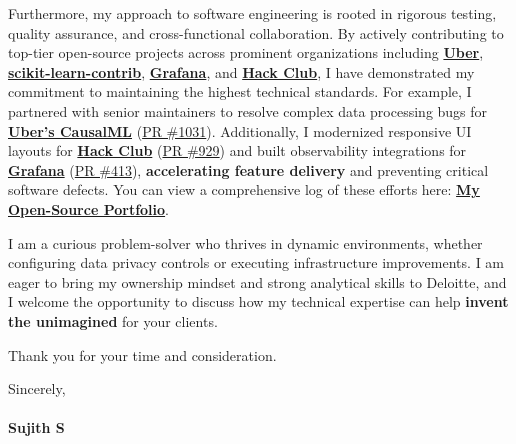 \documentclass[a4paper,11pt]{article}
\newcommand{\ulink}[2]{\href{#1}{#2}}
\begin{document}
Furthermore, my approach to software engineering is rooted in rigorous testing, quality assurance, and cross-functional collaboration. By actively contributing to top-tier open-source projects across prominent organizations including \ulink{https://github.com/uber}{\textbf{Uber}}, \ulink{https://github.com/scikit-learn-contrib}{\textbf{scikit-learn-contrib}}, \ulink{https://github.com/grafana}{\textbf{Grafana}}, and \ulink{https://github.com/hackclub}{\textbf{Hack Club}}, I have demonstrated my commitment to maintaining the highest technical standards. For example, I partnered with senior maintainers to resolve complex data processing bugs for \ulink{https://github.com/uber/causalml}{\textbf{Uber's CausalML}} (\ulink{https://github.com/uber/causalml/pull/1031}{PR \#1031}). Additionally, I modernized responsive UI layouts for \ulink{https://github.com/hackclub/stardance}{\textbf{Hack Club}} (\ulink{https://github.com/hackclub/stardance/pull/929}{PR \#929}) and built observability integrations for \ulink{https://github.com/grafana/alloy-scenarios}{\textbf{Grafana}} (\ulink{https://github.com/grafana/alloy-scenarios/pull/413}{PR \#413}), \textbf{accelerating feature delivery} and preventing critical software defects. You can view a comprehensive log of these efforts here: \ulink{https://github.com/su-jin1425/My-Open-Source-Contributions}{\textbf{My Open-Source Portfolio}}.

I am a curious problem-solver who thrives in dynamic environments, whether configuring data privacy controls or executing infrastructure improvements. I am eager to bring my ownership mindset and strong analytical skills to Deloitte, and I welcome the opportunity to discuss how my technical expertise can help \textbf{invent the unimagined} for your clients.

Thank you for your time and consideration.

Sincerely, \\
\vspace{5pt} \\
\textbf{Sujith S}
\end{document}
